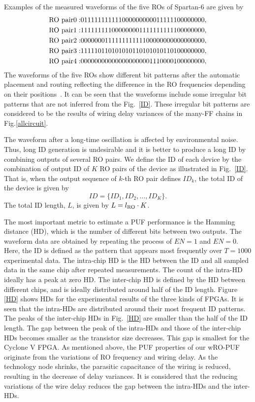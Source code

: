 ﻿\documentclass[aps,preprint,prb,superscriptaddress,amsmath,showpacs,tightenlines]{revtex4}
\begin{document}
Examples of the measured waveforms of the five ROs of Spartan-6 
are given by
\begin{eqnarray}
{\rm RO \ pair}0: &011111111111000000000011111100000000, \nonumber\\
{\rm RO \ pair}1: &111111111000000001111111111100000000, \nonumber\\
{\rm RO \ pair}2: &000000011111111111100000000000000000,\nonumber\\
{\rm RO \ pair}3: &111110110101010110101010110100000000,\nonumber\\
{\rm RO \ pair}4: &000000000000000000001110000100000000,\nonumber
\end{eqnarray}
The waveforms of the five ROs show different bit patterns 
after the automatic placement and routing
reflecting the difference in  the RO frequencies 
depending on their positions~\cite{Maiti0}.
It can be seen that the waveforms include some irregular bit patterns that are not
inferred from the  Fig.~\ref{ID}. These irregular bit patterns are considered to 
be the results of wiring delay variances of the many-FF chains in Fig.\ref{allcircuit}.


The waveform after a long-time oscillation is 
affected by environmental noise.
Thus, long ID generation is undesirable 
and it is better to produce a long ID by combining outputs of several RO pairs. 
We define the ID of each device by the combination of 
output ID of $K$ RO pairs of the device as illustrated in Fig.~\ref{ID}. 
That is, when the 
output sequence of $k$-th RO pair defines $ID_k$, the total ID of the device 
is given by 
\begin{equation}
ID=\{ ID_1, ID_2, \dots, ID_K\}.
\end{equation}
The total ID length, $L$, is given by $L=l_{\rm RO} \cdot K$.


The most important metric to estimate a PUF performance is 
the Hamming distance (HD), which is the number of 
different bits between two outputs.
The waveform data are obtained by repeating the process of $EN=1$ and $EN=0$.
Here, the ID is defined as the pattern that appears most frequently over $T=1000$ experimental data. 
The intra-chip HD is the HD between the ID and all sampled data in the same chip after repeated measurements.
The count of the intra-HD ideally has a peak at zero HD.
The inter-chip HD is defined by the HD between different chips, 
and is ideally distributed around half of the ID length.
Figure \ref{HD} shows  HDs for the experimental results of the 
three kinds of FPGAs. 
It is seen that the intra-HDs are distributed around their most frequent ID patterns.
The peaks of the inter-chip HDs in Fig.~\ref{HD} are smaller than the half of the ID length.
The gap between the peak of the intra-HDs and those of the inter-chip HDs 
becomes smaller as the transistor size decreases.
This gap is smallest for the Cyclone V FPGA.
As mentioned above, the PUF properties of our wRO-PUF originate from 
the variations of RO frequency and wiring delay. 
As the technology node shrinks,  
the parasitic capacitance of the wiring is reduced, 
resulting in the decrease of delay variances.
It is considered that the reducing variations of the wire delay 
reduces the gap between the intra-HDs and the inter-HDs. 
\end{document}
